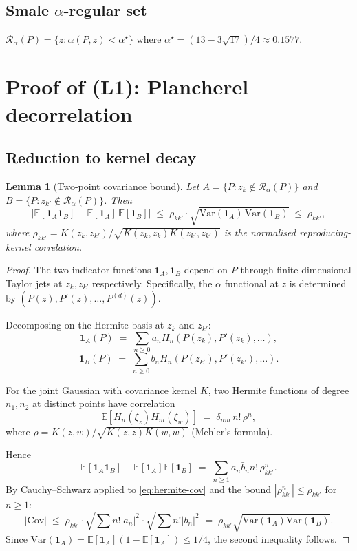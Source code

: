 \documentclass[11pt,a4paper]{article}
\newtheorem{lemma}[theorem]{Lemma}
\begin{document}
\subsection{Smale $\alpha$-regular set}

$\mathcal R_\alpha(P) = \{z : \alpha(P, z) < \alpha^\star\}$ where $\alpha^\star = (13 - 3\sqrt{17})/4 \approx 0.1577$.


\section{Proof of (L1): Plancherel decorrelation}\label{sec:proof-plancherel}

\subsection{Reduction to kernel decay}

\begin{lemma}[Two-point covariance bound]\label{lem:two-point}
Let $A = \{P : z_k \notin \mathcal R_\alpha(P)\}$ and $B = \{P : z_{k'} \notin \mathcal R_\alpha(P)\}$. Then
\begin{equation}\label{eq:two-point-cov}
|\mathbb E[\mathbf 1_A \mathbf 1_B] - \mathbb E[\mathbf 1_A]\,\mathbb E[\mathbf 1_B]| \;\le\; \rho_{kk'} \cdot \sqrt{\mathrm{Var}(\mathbf 1_A)\, \mathrm{Var}(\mathbf 1_B)} \;\le\; \rho_{kk'},
\end{equation}
where $\rho_{kk'} = K(z_k, z_{k'})/\sqrt{K(z_k,z_k) K(z_{k'},z_{k'})}$ is the normalised reproducing-kernel correlation.
\end{lemma}

\begin{proof}
The two indicator functions $\mathbf 1_A, \mathbf 1_B$ depend on $P$ through finite-dimensional Taylor jets at $z_k, z_{k'}$ respectively. Specifically, the $\alpha$ functional at $z$ is determined by $(P(z), P'(z), \dots, P^{(d)}(z))$.

Decomposing on the Hermite basis at $z_k$ and $z_{k'}$:
$$
\mathbf 1_A(P) \;=\; \sum_{n \ge 0} a_n H_n(P(z_k), P'(z_k), \dots),
$$
$$
\mathbf 1_B(P) \;=\; \sum_{n \ge 0} b_n H_n(P(z_{k'}), P'(z_{k'}), \dots).
$$

For the joint Gaussian with covariance kernel $K$, two Hermite functions of degree $n_1, n_2$ at distinct points have correlation
$$
\mathbb E[H_n(\xi_z) H_m(\xi_w)] \;=\; \delta_{nm}\, n!\, \rho^n,
$$
where $\rho = K(z, w)/\sqrt{K(z,z)K(w,w)}$ (Mehler's formula).

Hence
\begin{equation}\label{eq:hermite-cov}
\mathbb E[\mathbf 1_A \mathbf 1_B] - \mathbb E[\mathbf 1_A]\mathbb E[\mathbf 1_B]
\;=\; \sum_{n \ge 1} a_n \bar b_n n! \, \rho_{kk'}^n.
\end{equation}
By Cauchy--Schwarz applied to \eqref{eq:hermite-cov} and the bound $|\rho_{kk'}^n| \le \rho_{kk'}$ for $n \ge 1$:
$$
|\mathrm{Cov}| \;\le\; \rho_{kk'} \cdot \sqrt{\sum n!|a_n|^2}\cdot\sqrt{\sum n!|b_n|^2} \;=\; \rho_{kk'} \sqrt{\mathrm{Var}(\mathbf 1_A) \mathrm{Var}(\mathbf 1_B)}.
$$
Since $\mathrm{Var}(\mathbf 1_A) = \mathbb E[\mathbf 1_A](1 - \mathbb E[\mathbf 1_A]) \le 1/4$, the second inequality follows.
\end{proof}
\end{document}
